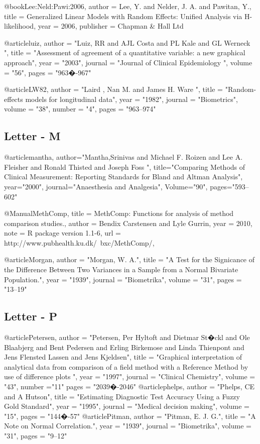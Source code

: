 @book{Lee:Neld:Pawi:2006,
	author = {Lee, Y. and Nelder, J. A. and Pawitan, Y.},
	title = {Generalized Linear Models with Random Effects: Unified Analysis via H-likelihood},
	year = {2006},
	publisher = {Chapman \& Hall Ltd}
}

@article{luiz,
	author = "Luiz, RR and AJL Costa and PL Kale and GL Werneck ",
	title = "Assessment of agreement of a quantitative variable: a new graphical approach",
	year = "2003",
	journal = "Journal of Clinical Epidemiology ",
	volume = "56",
	pages = "963�-967"
}


@article{LW82,
	author = "Laird , Nan M. and James H. Ware ",
	title = "Random-effects models for longitudinal data",
	year = "1982",
	journal = "Biometrics",
	volume = "38",
	number = "4",
	pages = "963--974"
}

\subsection*{Letter - M}

@article{mantha,
	author="Mantha,Srinivas and Michael F. Roizen and Lee A. Fleisher and Ronald Thisted and Joseph Foss ",
	title="Comparing Methods of Clinical Measurement: Reporting Standards for Bland and Altman Analysis",
	year="2000",
	journal="Anaesthesia and Analgesia",
	Volume="90",
	pages="593--602"
}

@Manual{MethComp,
	title = {MethComp: Functions for analysis of method comparison studies.},
	author = {Bendix Carstensen and Lyle Gurrin},
	year = {2010},
	note = {R package version 1.1-6},
	url = {http://www.pubhealth.ku.dk/~bxc/MethComp/},
}


@article{Morgan,
	author = "Morgan, W. A.",
	title = "A Test for the Signicance of the Difference Between Two Variances in a Sample from a Normal Bivariate Population.",
	year = "1939",
	journal = "Biometrika",
	volume = "31",
	pages = "13--19"
}

\subsection*{Letter - P}


@article{Petersen,
	author = "Petersen, Per Hyltoft and Dietmar St�ckl and Ole Blaabjerg and Bent Pedersen and Erling Birkemose and Linda Thienpont and Jens Flensted Lassen and Jens Kjeldsen",
	title = "Graphical interpretation of analytical data from comparison of a field method with a Reference Method by use of difference plots ",
	year = "1997",
	journal = "Clinical Chemistry",
	volume = "43",
	number ="11"
	pages = "2039�-2046"
}
@article{phelps,
	author = "Phelps, CE  and A Hutson",
	title = "Estimating Diagnostic Test Accuracy Using a Fuzzy Gold Standard",
	year = "1995",
	journal = "Medical decision making",
	volume = "15",
	pages = "144�-57"
}
@article{Pitman,
	author = "Pitman, E. J. G.",
	title = "A Note on Normal Correlation.",
	year = "1939",
	journal = "Biometrika",
	volume = "31",
	pages = "9--12"
}

